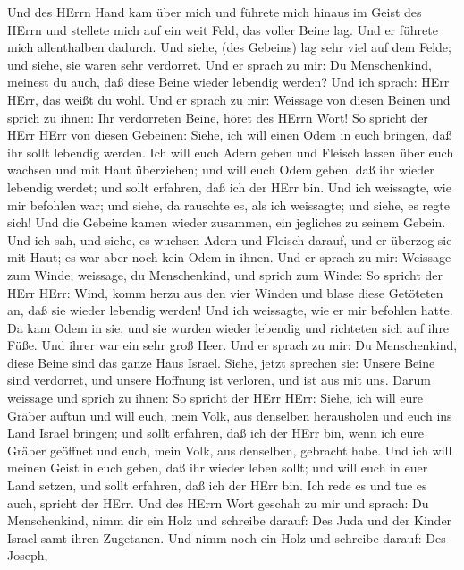 Und des HErrn Hand kam über mich und führete mich hinaus im
Geist des HErrn und stellete mich auf ein weit Feld, das voller Beine
lag.  Und er führete mich allenthalben dadurch. Und siehe,
(des Gebeins) lag sehr viel auf dem Felde; und siehe, sie waren sehr
verdorret.  Und er sprach zu mir: Du Menschenkind, meinest
du auch, daß diese Beine wieder lebendig werden? Und ich sprach: HErr
HErr, das weißt du wohl.  Und er sprach zu mir: Weissage von
diesen Beinen und sprich zu ihnen: Ihr verdorreten Beine, höret des
HErrn Wort!  So spricht der HErr HErr von diesen Gebeinen:
Siehe, ich will einen Odem in euch bringen, daß ihr sollt lebendig
werden.  Ich will euch Adern geben und Fleisch lassen über
euch wachsen und mit Haut überziehen; und will euch Odem geben, daß ihr
wieder lebendig werdet; und sollt erfahren, daß ich der HErr bin.
 Und ich weissagte, wie mir befohlen war; und siehe, da
rauschte es, als ich weissagte; und siehe, es regte sich! Und die
Gebeine kamen wieder zusammen, ein jegliches zu seinem Gebein.
 Und ich sah, und siehe, es wuchsen Adern und Fleisch
darauf, und er überzog sie mit Haut; es war aber noch kein Odem in
ihnen.  Und er sprach zu mir: Weissage zum Winde; weissage,
du Menschenkind, und sprich zum Winde: So spricht der HErr HErr: Wind,
komm herzu aus den vier Winden und blase diese Getöteten an, daß sie
wieder lebendig werden!  Und ich weissagte, wie er mir
befohlen hatte. Da kam Odem in sie, und sie wurden wieder lebendig und
richteten sich auf ihre Füße. Und ihrer war ein sehr groß Heer.
 Und er sprach zu mir: Du Menschenkind, diese Beine sind
das ganze Haus Israel. Siehe, jetzt sprechen sie: Unsere Beine sind
verdorret, und unsere Hoffnung ist verloren, und ist aus mit uns.
 Darum weissage und sprich zu ihnen: So spricht der HErr
HErr: Siehe, ich will eure Gräber auftun und will euch, mein Volk, aus
denselben herausholen und euch ins Land Israel bringen; 
und sollt erfahren, daß ich der HErr bin, wenn ich eure Gräber geöffnet
und euch, mein Volk, aus denselben, gebracht habe.  Und ich
will meinen Geist in euch geben, daß ihr wieder leben sollt; und will
euch in euer Land setzen, und sollt erfahren, daß ich der HErr bin. Ich
rede es und tue es auch, spricht der HErr.  Und des HErrn
Wort geschah zu mir und sprach:  Du Menschenkind, nimm dir
ein Holz und schreibe darauf: Des Juda und der Kinder Israel samt ihren
Zugetanen. Und nimm noch ein Holz und schreibe darauf: Des Joseph,
